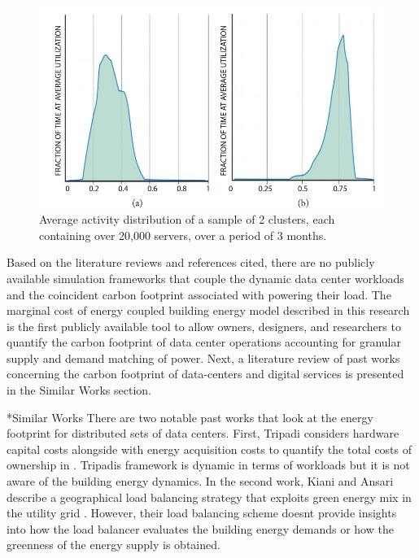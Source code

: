\documentclass[twocolumn, a4paper,10pt]{article}
\makeatletter
\renewcommand\section{\@startsection{section}{1}{\z@}{3pt}{3pt}{\normalfont\large\bfseries}}
\makeatother
\begin{document}
  \begin{figure}
    \centering
    \includegraphics[scale=.2]{img/google_activity_dist.png}
    \caption{Average activity distribution of a sample of 2 clusters, each containing over 20,000 servers, over a period of 3 months. \citep{barroso18}}
    \label{fig:google_activity_dist}
    \end{figure}

Based on the literature reviews and references cited, there are no publicly available simulation frameworks that couple the dynamic data center workloads and the coincident carbon footprint associated with powering their load. The marginal cost of energy coupled building energy model described in this research is the first publicly available tool to allow owners, designers, and researchers to quantify the carbon footprint of data center operations accounting for granular supply and demand matching of power. Next, a literature review of past works concerning the carbon footprint of data-centers and digital services is presented in the Similar Works section.


\section*{Similar Works}
There are two notable past works that look at the energy footprint for distributed sets of data centers. First, Tripadi considers hardware capital costs alongside with energy acquisition costs to quantify the total costs of ownership in \citep{tripadi17}. Tripadi\textsc{}s framework is dynamic in terms of workloads but it is not aware of the building energy dynamics. In the second work, Kiani and Ansari describe a geographical load balancing strategy that exploits green energy mix in the utility grid \citep{kiani17}. However, their load balancing scheme doesn\textsc{}t provide insights into how the load balancer evaluates the building energy demands or how the greenness of the energy supply is obtained. 
\end{document}
